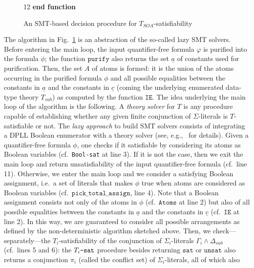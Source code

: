 \documentclass[conference]{IEEEtran}
\begin{document}
\begin{LONG}
\begin{figure}[tb]
\begin{center}
\begin{minipage}{.45\textwidth}
\begin{tabbing}
        12 \textbf{end function}
      \end{tabbing}
    \end{minipage}
  \end{center}
  \caption{\label{fig:smt-based-dec-proc-SOA}An SMT-based decision procedure for $T_\mathit{SOA}$-satisfiability}
\end{figure}
The algorithm in Fig.~\ref{fig:smt-based-dec-proc-SOA} is an
abstraction of the so-called lazy SMT solvers.  Before entering the
main loop, the input quantifier-free formula $\varphi$ is purified
into the formula $\phi$; the function $\mathtt{purify}$ also returns
the set $\underline{a}$ of constants used for purification.  Then, the
set $A$ of atoms is formed: it is the union of the atoms occurring in
the purified formula $\phi$ and all possible equalities between the
constants in $\underline{a}$ and the constants in $\underline{c}$
(coming the underlying enumerated data-type theory $T_\mathit{sub}$) as
computed by the function $\mathtt{IE}$.  The idea underlying the main
loop of the algorithm is the following.  A \emph{theory solver} for
$T$ is any procedure capable of establishing whether any given finite
conjunction of $\Sigma$-literals is $T$-satisfiable or not.  The
\emph{lazy approach} to build SMT solvers consists of integrating a
DPLL Boolean enumerator with a theory solver (see,
e.g.,~\cite{sebastiani} for details).  Given a quantifier-free formula
$\phi$, one checks if it satisfiable by considering its atoms as
Boolean variables (cf.\ \texttt{Bool-sat} at line 3).  If it is not
the case, then we exit the main loop and return unsatisfiability of
the input quantifier-free formula (cf.\ line 11).  Otherwise, we enter
the main loop and we consider a satisfying Boolean assignment, i.e.\ a
set of literals that makes $\phi$ true when atoms are considered as
Boolean variables (cf.\ $\mathtt{pick\_total\_assign}$, line 4).
Note that a Boolean assignment consists not only of the atoms in
$\phi$ (cf.\ $\mathtt{Atoms}$ at line 2) but also of all possible
equalities between the constants in $\underline{a}$ and the constants
in $\underline{c}$ (cf.\ $\mathtt{IE}$ at line 2).  In this way, we
are guaranteed to consider all possible arrangements as defined by the
non-deterministic algorithm sketched above.  Then, we
check---separately---the $T_i$-satisfiability of the conjunction of
$\Sigma_i$-literals $\Gamma_i\wedge \Delta_\mathit{sub}$ (cf.\ lines 5 and
6): the $T_i\mbox{\texttt{-sat}}$ procedure besides returning
$\mathtt{sat}$ or $\mathtt{unsat}$ also returns a conjunction $\pi_i$
(called the conflict set) of $\Sigma_i$-literals, all of which also

\end{LONG}
\end{document}
